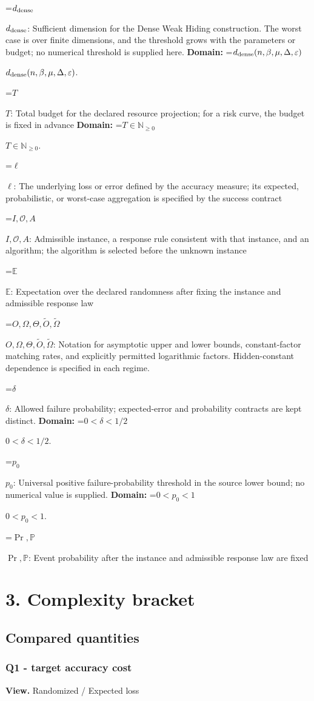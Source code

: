 \documentclass[10pt,a4paper]{article}
\newcommand{\AtlasMath}[1]{\par\begingroup\centering\setbox0=\hbox{$\displaystyle #1$}\ifdim\wd0>1.4\linewidth\typeout{ATLAS WIDE FORMULA: \the\wd0}\fi\ifdim\wd0>\linewidth\resizebox{\linewidth}{!}{\box0}\else\box0\fi\par\endgroup}
\newcommand{\AtlasInlineMath}[1]{\begingroup\setbox0=\hbox{$#1$}\ifdim\wd0>.4\linewidth\endgroup\AtlasMath{#1}\else\endgroup$#1$\fi}
\begin{document}
\AtlasInlineMath{d_{\rm dense}}: Sufficient dimension for the Dense Weak Hiding construction. The worst case is over finite dimensions, and the threshold grows with the parameters or budget; no numerical threshold is supplied here. \textbf{Domain:} \AtlasInlineMath{d_{\rm dense}(n,\beta,\mu,\Delta,\varepsilon)}.

\AtlasInlineMath{T}: Total budget for the declared resource projection; for a risk curve, the budget is fixed in advance \textbf{Domain:} \AtlasInlineMath{T\in\mathbb{N}_{\ge0}}.

\AtlasInlineMath{\ell}: The underlying loss or error defined by the accuracy measure; its expected, probabilistic, or worst-case aggregation is specified by the success contract

\AtlasInlineMath{I,\mathcal{O},A}: Admissible instance, a response rule consistent with that instance, and an algorithm; the algorithm is selected before the unknown instance

\AtlasInlineMath{\mathbb{E}}: Expectation over the declared randomness after fixing the instance and admissible response law

\AtlasInlineMath{O,\Omega,\Theta,\widetilde{O},\widetilde\Omega}: Notation for asymptotic upper and lower bounds, constant-factor matching rates, and explicitly permitted logarithmic factors. Hidden-constant dependence is specified in each regime.

\AtlasInlineMath{\delta}: Allowed failure probability; expected-error and probability contracts are kept distinct. \textbf{Domain:} \AtlasInlineMath{0<\delta<1/2}.

\AtlasInlineMath{p_0}: Universal positive failure-probability threshold in the source lower bound; no numerical value is supplied. \textbf{Domain:} \AtlasInlineMath{0<p_0<1}.

\AtlasInlineMath{\Pr,\mathbb{P}}: Event probability after the instance and admissible response law are fixed

\section{3. Complexity bracket}
\subsection{Compared quantities}
\subsubsection{Q1 - target accuracy cost}
\textbf{View.} Randomized / Expected loss
\end{document}
